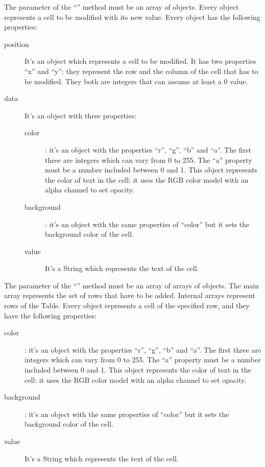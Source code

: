 			The parameter of the “” method must be an array of objects. Every object represents a cell to be modified with its new value. Every object has the following properties:
			\begin{description}
				\item[position] It's an object which represents a cell to be modified. It has two properties “x” and “y”: they represent the row and the column of the cell that has to be modified. They both are integers that can assume at least a 0 value.
				\item[data] It's an object with three properties:
				\begin{description}
					\item[color]: it's an object with the properties “r”, “g”, “b” and “a”. The first three are integers which can vary from 0 to 255. The “a” property must be a number included between 0 and 1.
					This object represents the color of text in the cell: it uses the RGB color model with an alpha channel to set opacity.
					\item[background]: it's an object with the same properties of “color” but it sets the background color of the cell.
					\item[value] It's a String which represents the text of the cell.
				\end{description}
			\end{description}
			The parameter of the “” method must be an array of arrays of objects. The main array represents the set of rows that have to be added. Internal arrays represent rows of the Table. Every object represents a cell of the specified row, and they have the following properties:
			\begin{description}
				\item[color]: it's an object with the properties “r”, “g”, “b” and “a”. The first three are integers which can vary from 0 to 255. The “a” property must be a number included between 0 and 1.
				This object represents the color of text in the cell: it uses the RGB color model with an alpha channel to set opacity.
				\item[background]: it's an object with the same properties of “color” but it sets the background color of the cell.
				\item[value] It's a String which represents the text of the cell.
			\end{description}
